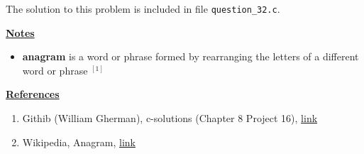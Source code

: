 \documentclass[12pt]{article}
\begin{document}
\begin{enumerate}[1.]
    \bigskip

    The solution to this problem is included in file \texttt{question\_32.c}.

    \bigskip

    \underline{\textbf{Notes}}

    \begin{itemize}
        \item \textbf{anagram} is a word or phrase formed by rearranging the letters of a different word or phrase $^{[1]}$
    \end{itemize}

    \bigskip

    \underline{\textbf{References}}

    \begin{enumerate}[1)]
        \item Githib (William Gherman), c-solutions (Chapter 8 Project 16), \href{https://github.com/williamgherman/c-solutions/blob/master/08/projects/16/16.c}{link}
        \item Wikipedia, Anagram, \href{https://en.wikipedia.org/wiki/Anagram}{link}
    \end{enumerate}

\end{enumerate}
\end{document}

